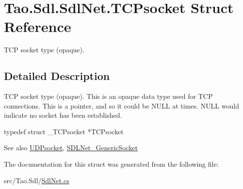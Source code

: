 \hypertarget{struct_tao_1_1_sdl_1_1_sdl_net_1_1_t_c_psocket}{
\section{Tao.Sdl.SdlNet.TCPsocket Struct Reference}
\label{struct_tao_1_1_sdl_1_1_sdl_net_1_1_t_c_psocket}
}


TCP socket type (opaque).  




\subsection{Detailed Description}
TCP socket type (opaque). This is an opaque data type used for TCP connections. This is a pointer, and so it could be NULL at times. NULL would indicate no socket has been established. 
\begin{DoxyCode}
                    typedef struct _TCPsocket *TCPsocket
\end{DoxyCode}


\begin{DoxySeeAlso}{See also}
\hyperlink{struct_tao_1_1_sdl_1_1_sdl_net_1_1_u_d_psocket}{UDPsocket}, \hyperlink{struct_tao_1_1_sdl_1_1_sdl_net_1_1_s_d_l_net___generic_socket}{SDLNet\_\-GenericSocket}


\end{DoxySeeAlso}


The documentation for this struct was generated from the following file:\begin{DoxyCompactItemize}
\item 
src/Tao.Sdl/\hyperlink{_sdl_net_8cs}{SdlNet.cs}\end{DoxyCompactItemize}
